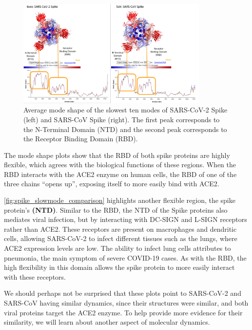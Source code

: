 \begin{figure}[h]
	\centering
	\mySfFamily
	\includegraphics[width = 0.85\textwidth]{../images/spike_slowmode_comparison.png}
	\caption{Average mode shape of the slowest ten modes of SARS-CoV-2 Spike (left) and SARS-CoV Spike (right). The first peak corresponds to the N-Terminal Domain (NTD) and the second peak corresponds to the Receptor Binding Domain (RBD).}
	\label{fig:spike_slowmode_comparison}
\end{figure}

The mode shape plots show that the RBD of both spike proteins are highly flexible, which agrees with the biological functions of these regions. When the RBD interacts with the ACE2 enzyme on human cells, the RBD of one of the three chains ``opens up'', exposing itself to more easily bind with ACE2.

\autoref{fig:spike_slowmode_comparison} highlights another flexible region, the spike protein's  \textbf{(NTD)}. Similar to the RBD, the NTD of the Spike proteins also mediates viral infection, but by interacting with DC-SIGN and L-SIGN receptors rather than ACE2. These receptors are present on macrophages and dendritic cells, allowing SARS-CoV-2 to infect different tissues such as the lungs, where ACE2 expression levels are low. The ability to infect lung cells attributes to pneumonia, the main symptom of severe COVID-19 cases. As with the RBD, the high flexibility in this domain allows the spike protein to more easily interact with these receptors.

We should perhaps not be surprised that these plots point to SARS-CoV-2 and SARS-CoV having similar dynamics, since their structures were similar, and both viral proteins target the ACE2 enzyme. To help provide more evidence for their similarity, we will learn about another aspect of molecular dynamics.

